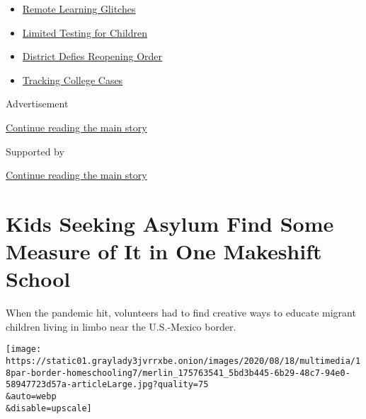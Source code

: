 \begin{itemize}
\tightlist
\item
  \href{https://www.nytimes3xbfgragh.onion/2020/09/08/us/school-districts-cyberattacks-glitches.html?name=styln-coronavirus-schools-reopening\&region=TOP_BANNER\&block=storyline_menu_recirc\&action=click\&pgtype=Article\&impression_id=4a530b41-f4d1-11ea-b32a-256dc0696bd9\&variant=undefined}{Remote
  Learning Glitches}
\item
  \href{https://www.nytimes3xbfgragh.onion/2020/09/08/upshot/children-testing-shortfalls-virus.html?name=styln-coronavirus-schools-reopening\&region=TOP_BANNER\&block=storyline_menu_recirc\&action=click\&pgtype=Article\&impression_id=4a533250-f4d1-11ea-b32a-256dc0696bd9\&variant=undefined}{Limited
  Testing for Children}
\item
  \href{https://www.nytimes3xbfgragh.onion/2020/09/10/us/des-moines-school-opening-coronavirus.html?name=styln-coronavirus-schools-reopening\&region=TOP_BANNER\&block=storyline_menu_recirc\&action=click\&pgtype=Article\&impression_id=4a533251-f4d1-11ea-b32a-256dc0696bd9\&variant=undefined}{District
  Defies Reopening Order}
\item
  \href{https://www.nytimes3xbfgragh.onion/interactive/2020/us/covid-college-cases-tracker.html?name=styln-coronavirus-schools-reopening\&region=TOP_BANNER\&block=storyline_menu_recirc\&action=click\&pgtype=Article\&impression_id=4a533252-f4d1-11ea-b32a-256dc0696bd9\&variant=undefined}{Tracking
  College Cases}
\end{itemize}

Advertisement

\protect\hyperlink{after-top}{Continue reading the main story}

Supported by

\protect\hyperlink{after-sponsor}{Continue reading the main story}

\hypertarget{kids-seeking-asylum-find-some-measure-of-it-in-one-makeshift-school}{%
\section{Kids Seeking Asylum Find Some Measure of It in One Makeshift
School}\label{kids-seeking-asylum-find-some-measure-of-it-in-one-makeshift-school}}

When the pandemic hit, volunteers had to find creative ways to educate
migrant children living in limbo near the U.S.-Mexico border.

\texttt{[image: https://static01.graylady3jvrrxbe.onion/images/2020/08/18/multimedia/18par-border-homeschooling7/merlin\_175763541\_5bd3b445-6b29-48c7-94e0-58947723d57a-articleLarge.jpg?quality=75\\\&auto=webp\\\&disable=upscale]}

